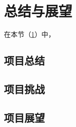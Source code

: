 \section{总结与展望}\label{sec:ConclusionAndOutlook}

在本节（\cref{sec:ConclusionAndOutlook}）中，

\subsection{项目总结}

\subsection{项目挑战}

\subsection{项目展望}